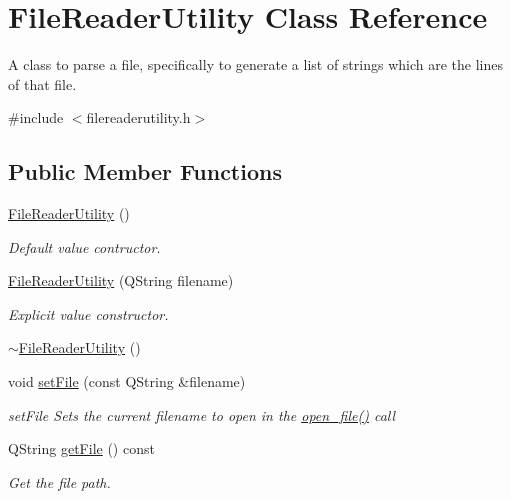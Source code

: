\hypertarget{classFileReaderUtility}{\section{File\-Reader\-Utility Class Reference}
\label{classFileReaderUtility}
}


A class to parse a file, specifically to generate a list of strings which are the lines of that file.  




{\ttfamily \#include $<$filereaderutility.\-h$>$}

\subsection*{Public Member Functions}
\begin{DoxyCompactItemize}
\item 
\hyperlink{classFileReaderUtility_a6cabb02a585207c222063e17c23bc345}{File\-Reader\-Utility} ()
\begin{DoxyCompactList}\small\item\em Default value contructor. \end{DoxyCompactList}\item 
\hyperlink{classFileReaderUtility_a470ee17457de07fe519aaf8e607a82bc}{File\-Reader\-Utility} (Q\-String filename)
\begin{DoxyCompactList}\small\item\em Explicit value constructor. \end{DoxyCompactList}\item 
\hyperlink{classFileReaderUtility_ae7cea9f17577620d7c678d8379ee103c}{$\sim$\-File\-Reader\-Utility} ()
\item 
void \hyperlink{classFileReaderUtility_a8d4984a9b7f18c589906d6e26956402b}{set\-File} (const Q\-String \&filename)
\begin{DoxyCompactList}\small\item\em set\-File Sets the current filename to open in the \hyperlink{classFileReaderUtility_a77c879620e0ddcc16e966649a73aa5c5}{open\-\_\-file()} call \end{DoxyCompactList}\item 
Q\-String \hyperlink{classFileReaderUtility_a9a871c01eeb7336d5d2cbc90d1550d3d}{get\-File} () const 
\begin{DoxyCompactList}\small\item\em Get the file path. \end{DoxyCompactList}\item 

\end{DoxyCompactItemize}
